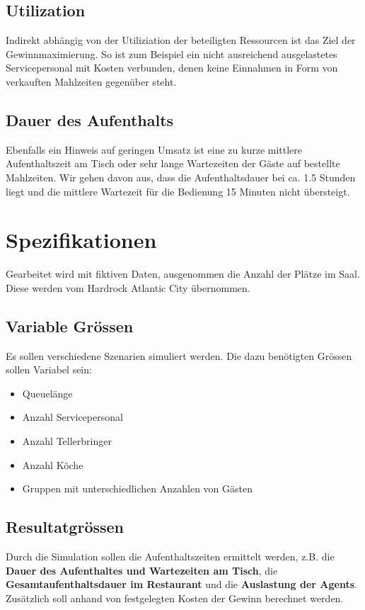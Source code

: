 \documentclass[ngerman,a4paper,12pt]{scrreprt}
\begin{document}
	\subsection{Utilization}
	Indirekt abhängig von der Utiliziation der beteiligten Ressourcen ist das Ziel der Gewinnmaximierung. So ist zum Beispiel ein nicht ausreichend ausgelastetes Servicepersonal mit Kosten verbunden, denen keine Einnahmen in Form von verkauften Mahlzeiten gegenüber steht.
	  
	\subsection{Dauer des Aufenthalts}
		Ebenfalls ein Hinweis auf geringen Umsatz ist eine zu kurze mittlere Aufenthaltszeit am Tisch oder sehr lange Wartezeiten der Gäste auf bestellte Mahlzeiten. Wir gehen davon aus, dass die Aufenthaltsdauer bei ca. 1.5 Stunden liegt und die mittlere Wartezeit für die Bedienung 15 Minuten nicht übersteigt.

\section{Spezifikationen}
	Gearbeitet wird mit fiktiven Daten, ausgenommen die Anzahl der Plätze im Saal. Diese werden vom Hardrock Atlantic City übernommen.

	\subsection{Variable Grössen}
		Es sollen verschiedene Szenarien simuliert werden. Die dazu benötigten Grössen sollen Variabel sein:
		\begin{itemize}
			\item Queuelänge
			\item Anzahl Servicepersonal
			\item Anzahl Tellerbringer
			\item Anzahl Köche
			\item Gruppen mit unterschiedlichen Anzahlen von Gästen
		\end{itemize}

	\subsection{Resultatgrössen}
		Durch die Simulation sollen die Aufenthaltszeiten ermittelt werden, z.B. die \textbf{Dauer des Aufenthaltes und Wartezeiten am Tisch}, die \textbf{Gesamtaufenthaltsdauer im Restaurant} und die \textbf{Auslastung der Agents}.
Zusätzlich soll anhand von festgelegten Kosten der Gewinn berechnet werden.
\end{document}
